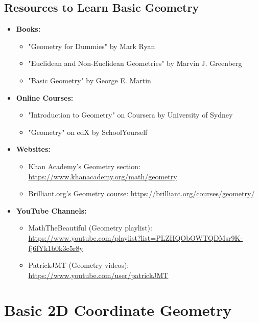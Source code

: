 \documentclass[openany]{book}
\begin{document}
\subsection{Resources to Learn Basic Geometry}
\begin{itemize}
    \item \textbf{Books:}
    \begin{itemize}
        \item "Geometry for Dummies" by Mark Ryan
        \item "Euclidean and Non-Euclidean Geometries" by Marvin J. Greenberg
        \item "Basic Geometry" by George E. Martin
    \end{itemize}
    \item \textbf{Online Courses:}
    \begin{itemize}
        \item "Introduction to Geometry" on Coursera by University of Sydney
        \item "Geometry" on edX by SchoolYourself
    \end{itemize}
    \item \textbf{Websites:}
    \begin{itemize}
        \item Khan Academy's Geometry section: \url{https://www.khanacademy.org/math/geometry}
        \item Brilliant.org's Geometry course: \url{https://brilliant.org/courses/geometry/}
    \end{itemize}
    \item \textbf{YouTube Channels:}
    \begin{itemize}
        \item MathTheBeautiful (Geometry playlist): \url{https://www.youtube.com/playlist?list=PLZHQObOWTQDMsr9K-fj6fYk1b0k3c5r8y}
        \item PatrickJMT (Geometry videos): \url{https://www.youtube.com/user/patrickJMT}
    \end{itemize}
\end{itemize}
\section{Basic 2D Coordinate Geometry}
\end{document}
